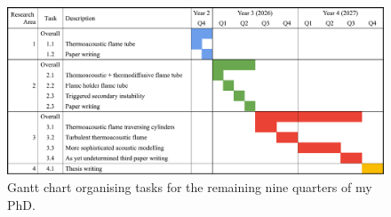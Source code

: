 \begin{figure}[t]
\centering
\includegraphics[scale=0.5]{assets/graphs/2YR_Gantt.pdf}
\caption{Gantt chart organising tasks for the remaining nine quarters of my PhD.}
\label{fig:gantt}
\end{figure}

